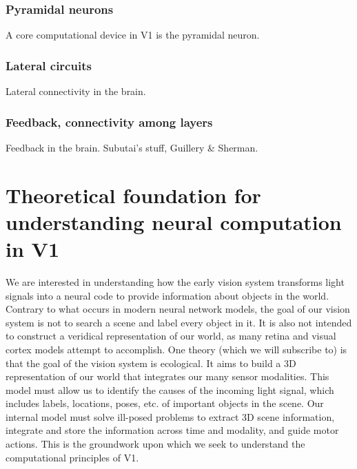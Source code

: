 \subsubsection{Pyramidal neurons}
A core computational device in V1 is the pyramidal neuron.

\subsubsection{Lateral circuits}
Lateral connectivity in the brain.

\subsubsection{Feedback, connectivity among layers}
Feedback in the brain. Subutai's stuff, Guillery \& Sherman.

\section{Theoretical foundation for understanding neural computation in V1}
We are interested in understanding how the early vision system transforms light signals into a neural code to provide information about objects in the world.
Contrary to what occurs in modern neural network models, the goal of our vision system is not to search a scene and label every object in it. It is also not intended to construct a veridical representation of our world, as many retina and visual cortex models attempt to accomplish. One theory (which we will subscribe to) is that the goal of the vision system is ecological. It aims to build a 3D representation of our world that integrates our many sensor modalities. This model must allow us to identify the causes of the incoming light signal, which includes labels, locations, poses, etc. of important objects in the scene. Our internal model must solve ill-posed problems to extract 3D scene information, integrate and store the information across time and modality, and guide motor actions. This is the groundwork upon which we seek to understand the computational principles of V1.


